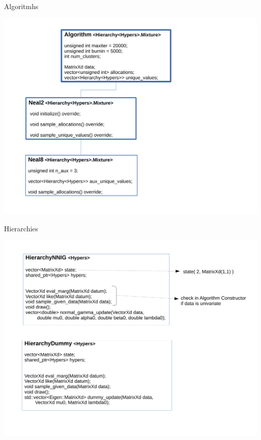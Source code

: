 

\begin{frame}{Algoritmhs}
	\begin{center}
		\includegraphics[scale=0.35]{etc/algo.pdf}
	\end{center}
\end{frame}

\begin{frame}{Hierarchies}
	\begin{center}
		\includegraphics[scale=0.35]{etc/hierarchy.pdf}
	\end{center}

\end{frame}

